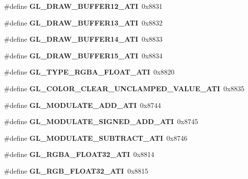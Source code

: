 \begin{DoxyCompactItemize}
\item 
\#define {\bfseries G\+L\+\_\+\+D\+R\+A\+W\+\_\+\+B\+U\+F\+F\+E\+R12\+\_\+\+A\+T\+I}~0x8831\label{_s_d_l__opengl_8h_a2b63e757d04bc7e9df8402cf6e15320e}

\item 
\#define {\bfseries G\+L\+\_\+\+D\+R\+A\+W\+\_\+\+B\+U\+F\+F\+E\+R13\+\_\+\+A\+T\+I}~0x8832\label{_s_d_l__opengl_8h_a65a010a6348e6a1df716e573b5ce5bb5}

\item 
\#define {\bfseries G\+L\+\_\+\+D\+R\+A\+W\+\_\+\+B\+U\+F\+F\+E\+R14\+\_\+\+A\+T\+I}~0x8833\label{_s_d_l__opengl_8h_a3c35a4b156c49be36d961dfbdf01f978}

\item 
\#define {\bfseries G\+L\+\_\+\+D\+R\+A\+W\+\_\+\+B\+U\+F\+F\+E\+R15\+\_\+\+A\+T\+I}~0x8834\label{_s_d_l__opengl_8h_a265392fad514a30a0ecf8d0170d56b13}

\item 
\#define {\bfseries G\+L\+\_\+\+T\+Y\+P\+E\+\_\+\+R\+G\+B\+A\+\_\+\+F\+L\+O\+A\+T\+\_\+\+A\+T\+I}~0x8820\label{_s_d_l__opengl_8h_a0f048913730242239da65c79fe956a01}

\item 
\#define {\bfseries G\+L\+\_\+\+C\+O\+L\+O\+R\+\_\+\+C\+L\+E\+A\+R\+\_\+\+U\+N\+C\+L\+A\+M\+P\+E\+D\+\_\+\+V\+A\+L\+U\+E\+\_\+\+A\+T\+I}~0x8835\label{_s_d_l__opengl_8h_a11c28a6c42e070ca6ef680200652eab6}

\item 
\#define {\bfseries G\+L\+\_\+\+M\+O\+D\+U\+L\+A\+T\+E\+\_\+\+A\+D\+D\+\_\+\+A\+T\+I}~0x8744\label{_s_d_l__opengl_8h_aaac3fca68057ea3228d545ac9426e417}

\item 
\#define {\bfseries G\+L\+\_\+\+M\+O\+D\+U\+L\+A\+T\+E\+\_\+\+S\+I\+G\+N\+E\+D\+\_\+\+A\+D\+D\+\_\+\+A\+T\+I}~0x8745\label{_s_d_l__opengl_8h_ae1cccc0d5f7edcae559dea44117aed4a}

\item 
\#define {\bfseries G\+L\+\_\+\+M\+O\+D\+U\+L\+A\+T\+E\+\_\+\+S\+U\+B\+T\+R\+A\+C\+T\+\_\+\+A\+T\+I}~0x8746\label{_s_d_l__opengl_8h_a95563a11efaec5e9f54c8402423951be}

\item 
\#define {\bfseries G\+L\+\_\+\+R\+G\+B\+A\+\_\+\+F\+L\+O\+A\+T32\+\_\+\+A\+T\+I}~0x8814\label{_s_d_l__opengl_8h_ac7e134b342b372a4b9e25815f8b9e7bd}

\item 
\#define {\bfseries G\+L\+\_\+\+R\+G\+B\+\_\+\+F\+L\+O\+A\+T32\+\_\+\+A\+T\+I}~0x8815\label{_s_d_l__opengl_8h_a182d2ed5e359b77f1e661ad2332a1c84}


\end{DoxyCompactItemize}

